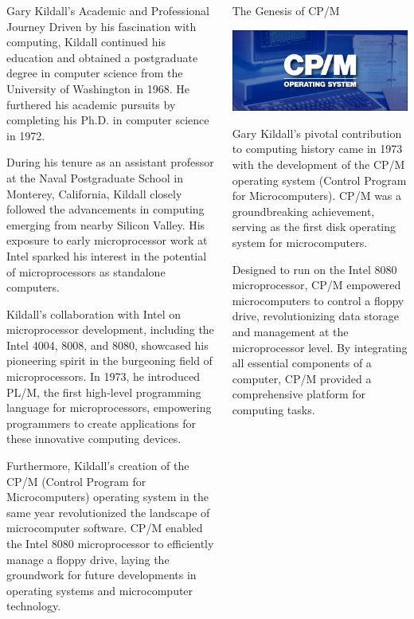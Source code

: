 \documentclass{beamer}
\begin{document}
\begin{frame}[t]{}
\begin{columns}
\begin{column}[T]{0.27\textwidth}
\begin{block}{\large Gary Kildall's Academic and Professional Journey}
Driven by his fascination with computing, Kildall continued his education and obtained a postgraduate degree in computer science from the University of Washington in 1968. He furthered his academic pursuits by completing his Ph.D. in computer science in 1972.

During his tenure as an assistant professor at the Naval Postgraduate School in Monterey, California, Kildall closely followed the advancements in computing emerging from nearby Silicon Valley. His exposure to early microprocessor work at Intel sparked his interest in the potential of microprocessors as standalone computers.

Kildall's collaboration with Intel on microprocessor development, including the Intel 4004, 8008, and 8080, showcased his pioneering spirit in the burgeoning field of microprocessors. In 1973, he introduced PL/M, the first high-level programming language for microprocessors, empowering programmers to create applications for these innovative computing devices.

Furthermore, Kildall's creation of the CP/M (Control Program for Microcomputers) operating system in the same year revolutionized the landscape of microcomputer software. CP/M enabled the Intel 8080 microprocessor to efficiently manage a floppy drive, laying the groundwork for future developments in operating systems and microcomputer technology.\cite{giants}
\end{block}
\end{column}

\begin{column}[T]{0.72\textwidth}
\begin{block}{\large The Genesis of CP/M}
  \begin{center}
    \includegraphics[width=0.4\linewidth]{images/CPM.jpg} %
\end{center}
  Gary Kildall's pivotal contribution to computing history came in 1973 with the development of the CP/M operating system (Control Program for Microcomputers). CP/M was a groundbreaking achievement, serving as the first disk operating system for microcomputers.

Designed to run on the Intel 8080 microprocessor, CP/M empowered microcomputers to control a floppy drive, revolutionizing data storage and management at the microprocessor level. By integrating all essential components of a computer, CP/M provided a comprehensive platform for computing tasks.


\end{block}
\end{column}
\end{columns}
\end{frame}
\end{document}
